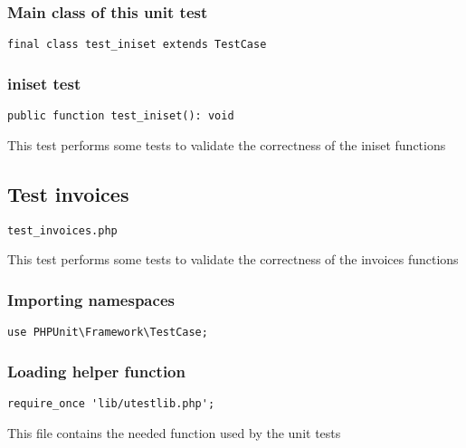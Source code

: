 \documentclass[a4paper]{article}
\begin{document}
\hypertarget{toc247}{}
\subsubsection{Main class of this unit test}

\begin{lstlisting}
final class test_iniset extends TestCase
\end{lstlisting}

\hypertarget{toc248}{}
\subsubsection{iniset test}

\begin{lstlisting}
public function test_iniset(): void
\end{lstlisting}

This test performs some tests to validate the correctness
of the iniset functions

\hypertarget{toc249}{}
\subsection{Test invoices}

\begin{lstlisting}
test_invoices.php
\end{lstlisting}

This test performs some tests to validate the correctness
of the invoices functions

\hypertarget{toc250}{}
\subsubsection{Importing namespaces}

\begin{lstlisting}
use PHPUnit\Framework\TestCase;
\end{lstlisting}

\hypertarget{toc251}{}
\subsubsection{Loading helper function}

\begin{lstlisting}
require_once 'lib/utestlib.php';
\end{lstlisting}

This file contains the needed function used by the unit tests

\hypertarget{toc252}{}
\end{document}
